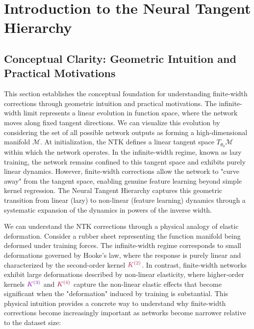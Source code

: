 \documentclass[a4paper]{article}
\theoremstyle{plain}
\theoremstyle{definition}
\theoremstyle{remark}
\begin{document}
\newpage




\section{Introduction to the Neural Tangent Hierarchy}


\subsection{Conceptual Clarity: Geometric Intuition and Practical Motivations}

This section establishes the conceptual foundation for understanding finite-width corrections through geometric intuition and practical motivations. The infinite-width limit represents a linear evolution in function space, where the network moves along fixed tangent directions. We can visualize this evolution by considering the set of all possible network outputs as forming a high-dimensional manifold $\mathcal{M}$. At initialization, the NTK defines a linear tangent space $T_{\theta_0}\mathcal{M}$ within which the network operates. In the infinite-width regime, known as lazy training, the network remains confined to this tangent space and exhibits purely linear dynamics. However, finite-width corrections allow the network to "curve away" from the tangent space, enabling genuine feature learning beyond simple kernel regression. The Neural Tangent Hierarchy captures this geometric transition from linear (lazy) to non-linear (feature learning) dynamics through a systematic expansion of the dynamics in powers of the inverse width.

We can understand the NTK corrections through a physical analogy of elastic deformation. Consider a rubber sheet representing the function manifold being deformed under training forces. The infinite-width regime corresponds to small deformations governed by Hooke's law, where the response is purely linear and characterized by the second-order kernel $\textcolor{kernelcolor}{K^{(2)}}$. In contrast, finite-width networks exhibit large deformations described by non-linear elasticity, where higher-order kernels $\textcolor{k3color}{K^{(3)}}$ and $\textcolor{purple}{K^{(4)}}$ capture the non-linear elastic effects that become significant when the "deformation" induced by training is substantial. This physical intuition provides a concrete way to understand why finite-width corrections become increasingly important as networks become narrower relative to the dataset size:
\end{document}

